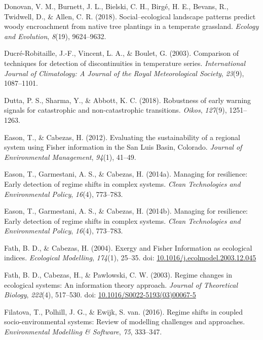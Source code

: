 \documentclass[12pt,twoside,openany]{reedthesis}
\begin{document}
\leavevmode\hypertarget{ref-donovan2018social}{}%
Donovan, V. M., Burnett, J. L., Bielski, C. H., Birgé, H. E., Bevans, R., Twidwell, D., \& Allen, C. R. (2018). Social--ecological landscape patterns predict woody encroachment from native tree plantings in a temperate grassland. \emph{Ecology and Evolution}, \emph{8}(19), 9624--9632.

\leavevmode\hypertarget{ref-ducre2003comparison}{}%
Ducré-Robitaille, J.-F., Vincent, L. A., \& Boulet, G. (2003). Comparison of techniques for detection of discontinuities in temperature series. \emph{International Journal of Climatology: A Journal of the Royal Meteorological Society}, \emph{23}(9), 1087--1101.

\leavevmode\hypertarget{ref-dutta2018robustness}{}%
Dutta, P. S., Sharma, Y., \& Abbott, K. C. (2018). Robustness of early warning signals for catastrophic and non-catastrophic transitions. \emph{Oikos}, \emph{127}(9), 1251--1263.

\leavevmode\hypertarget{ref-eason_evaluating_2012}{}%
Eason, T., \& Cabezas, H. (2012). Evaluating the sustainability of a regional system using Fisher information in the San Luis Basin, Colorado. \emph{Journal of Environmental Management}, \emph{94}(1), 41--49.

\leavevmode\hypertarget{ref-eason_managing_2014}{}%
Eason, T., Garmestani, A. S., \& Cabezas, H. (2014a). Managing for resilience: Early detection of regime shifts in complex systems. \emph{Clean Technologies and Environmental Policy}, \emph{16}(4), 773--783.

\leavevmode\hypertarget{ref-eason2014managing}{}%
Eason, T., Garmestani, A. S., \& Cabezas, H. (2014b). Managing for resilience: Early detection of regime shifts in complex systems. \emph{Clean Technologies and Environmental Policy}, \emph{16}(4), 773--783.

\leavevmode\hypertarget{ref-fath_exergy_2004}{}%
Fath, B. D., \& Cabezas, H. (2004). Exergy and Fisher Information as ecological indices. \emph{Ecological Modelling}, \emph{174}(1), 25--35. doi: \href{https://doi.org/10.1016/j.ecolmodel.2003.12.045}{10.1016/j.ecolmodel.2003.12.045}

\leavevmode\hypertarget{ref-fath_regime_2003}{}%
Fath, B. D., Cabezas, H., \& Pawlowski, C. W. (2003). Regime changes in ecological systems: An information theory approach. \emph{Journal of Theoretical Biology}, \emph{222}(4), 517--530. doi: \href{https://doi.org/10.1016/S0022-5193(03)00067-5}{10.1016/S0022-5193(03)00067-5}

\leavevmode\hypertarget{ref-filatova2016regime}{}%
Filatova, T., Polhill, J. G., \& Ewijk, S. van. (2016). Regime shifts in coupled socio-environmental systems: Review of modelling challenges and approaches. \emph{Environmental Modelling \& Software}, \emph{75}, 333--347.
\end{document}
